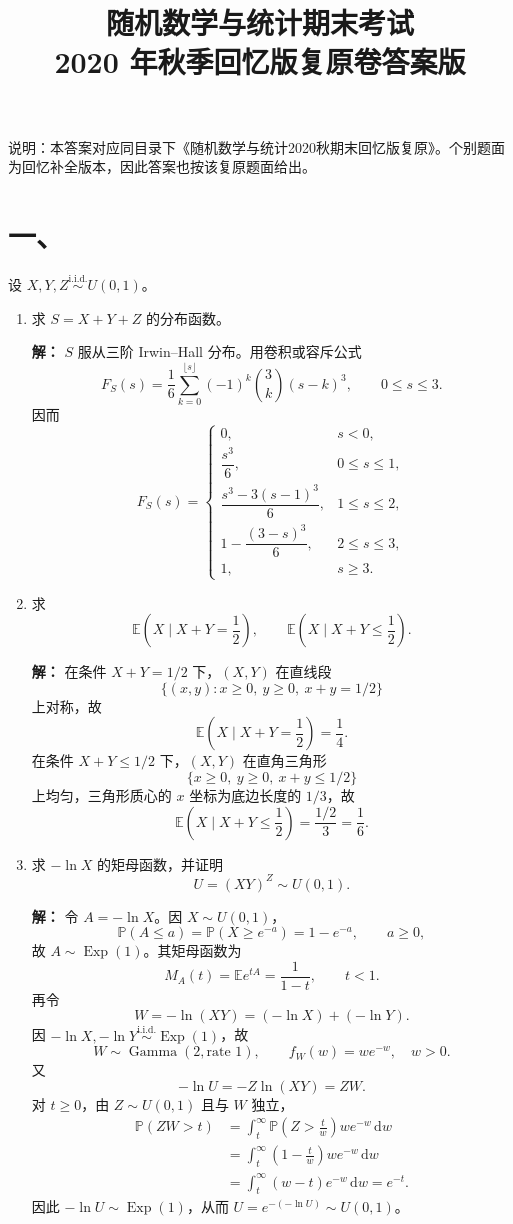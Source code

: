 \documentclass[UTF8,zihao=-4,fontset=windows]{ctexart}
\title{\vspace{-1.2cm}随机数学与统计期末考试\\{\large 2020 年秋季回忆版复原卷答案版}}
\author{}
\date{}
\newcommand{\Prob}{\mathbb P}
\newcommand{\EX}{\mathbb E}
\newcommand{\iid}{\overset{\mathrm{i.i.d.}}{\sim}}
\newcommand{\dd}{\,\mathrm d}
\newcommand{\Exp}{\operatorname{Exp}}
\newcommand{\GammaDist}{\operatorname{Gamma}}
\newcommand{\ans}[1]{\textcolor{ansblue}{\textbf{#1}}}
\begin{document}
\maketitle
\vspace{-1.4em}

说明：本答案对应同目录下《随机数学与统计2020秋期末回忆版复原》。个别题面为回忆补全版本，因此答案也按该复原题面给出。

\section*{一、}
设 $X,Y,Z \iid U(0,1)$。
\begin{enumerate}
  \item 求 $S=X+Y+Z$ 的分布函数。

  \ans{解：} $S$ 服从三阶 Irwin--Hall 分布。用卷积或容斥公式
  \[
    F_S(s)=\frac{1}{6}\sum_{k=0}^{\lfloor s\rfloor}(-1)^k
    \binom{3}{k}(s-k)^3,\qquad 0\le s\le 3.
  \]
  因而
  \[
    F_S(s)=
    \begin{cases}
      0, & s<0,\\[0.2em]
      \dfrac{s^3}{6}, & 0\le s\le 1,\\[0.7em]
      \dfrac{s^3-3(s-1)^3}{6}, & 1\le s\le 2,\\[0.7em]
      1-\dfrac{(3-s)^3}{6}, & 2\le s\le 3,\\[0.7em]
      1, & s\ge 3.
    \end{cases}
  \]

  \item 求
  \[
    \EX\left(X\mid X+Y=\frac12\right),\qquad
    \EX\left(X\mid X+Y\le \frac12\right).
  \]

  \ans{解：} 在条件 $X+Y=1/2$ 下，$(X,Y)$ 在直线段
  \[
    \{(x,y):x\ge0,\ y\ge0,\ x+y=1/2\}
  \]
  上对称，故
  \[
    \EX\left(X\mid X+Y=\frac12\right)=\frac14.
  \]
  在条件 $X+Y\le 1/2$ 下，$(X,Y)$ 在直角三角形
  \[
    \{x\ge0,\ y\ge0,\ x+y\le1/2\}
  \]
  上均匀，三角形质心的 $x$ 坐标为底边长度的 $1/3$，故
  \[
    \EX\left(X\mid X+Y\le\frac12\right)=\frac{1/2}{3}=\frac16.
  \]

  \item 求 $-\ln X$ 的矩母函数，并证明
  \[
    U=(XY)^Z\sim U(0,1).
  \]

  \ans{解：} 令 $A=-\ln X$。因 $X\sim U(0,1)$，
  \[
    \Prob(A\le a)=\Prob(X\ge e^{-a})=1-e^{-a},\qquad a\ge0,
  \]
  故 $A\sim \Exp(1)$。其矩母函数为
  \[
    M_A(t)=\EX e^{tA}=\frac{1}{1-t},\qquad t<1.
  \]
  再令
  \[
    W=-\ln(XY)=(-\ln X)+(-\ln Y).
  \]
  因 $-\ln X,-\ln Y \iid \Exp(1)$，故
  \[
    W\sim\GammaDist(2,\text{rate }1),\qquad f_W(w)=w e^{-w},\quad w>0.
  \]
  又
  \[
    -\ln U=-Z\ln(XY)=ZW.
  \]
  对 $t\ge0$，由 $Z\sim U(0,1)$ 且与 $W$ 独立，
  \[
  \begin{aligned}
    \Prob(ZW>t)
    &=\int_t^\infty \Prob\left(Z>\frac{t}{w}\right)w e^{-w}\dd w\\
    &=\int_t^\infty \left(1-\frac{t}{w}\right)w e^{-w}\dd w\\
    &=\int_t^\infty (w-t)e^{-w}\dd w=e^{-t}.
  \end{aligned}
  \]
  因此 $-\ln U\sim\Exp(1)$，从而 $U=e^{-(-\ln U)}\sim U(0,1)$。
\end{enumerate}
\end{document}
